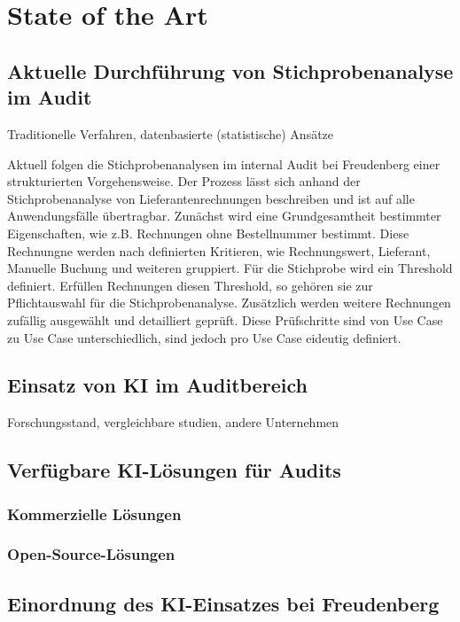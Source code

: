 \chapter{State of the Art}

\section{Aktuelle Durchführung von Stichprobenanalyse im Audit}
Traditionelle Verfahren, datenbasierte (statistische) Ansätze

Aktuell folgen die Stichprobenanalysen im internal Audit bei Freudenberg einer strukturierten Vorgehensweise. Der Prozess lässt sich anhand der Stichprobenanalyse von Lieferantenrechnungen beschreiben und ist auf alle Anwendungsfälle übertragbar. Zunächst wird eine Grundgesamtheit bestimmter Eigenschaften, wie z.B. Rechnungen ohne Bestellnummer bestimmt. Diese Rechnungne werden nach definierten Kritieren, wie Rechnungswert, Lieferant, Manuelle Buchung und weiteren gruppiert. Für die Stichprobe wird ein Threshold definiert. Erfüllen Rechnungen diesen Threshold, so gehören sie zur Pflichtauswahl für die Stichprobenanalyse. Zusätzlich werden weitere Rechnungen zufällig ausgewählt und detailliert geprüft. Diese Prüfschritte sind von Use Case zu Use Case unterschiedlich, sind jedoch pro Use Case eideutig definiert. 
\section{Einsatz von KI im Auditbereich}
Forschungsstand, vergleichbare studien, andere Unternehmen

\section{Verfügbare KI-Lösungen für Audits}

\subsection{Kommerzielle Lösungen}

\subsection{Open-Source-Lösungen}

\section{Einordnung des KI-Einsatzes bei Freudenberg}
 